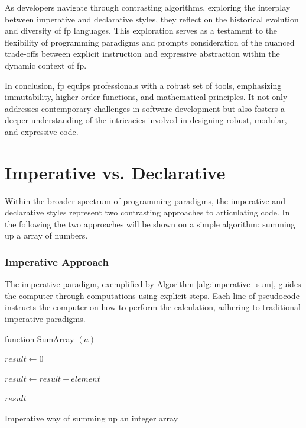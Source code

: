     As developers navigate through contrasting algorithms, exploring the interplay between imperative and declarative styles, they reflect on the historical evolution and diversity of \ac{fp} languages. This exploration serves as a testament to the flexibility of programming paradigms and prompts consideration of the nuanced trade-offs between explicit instruction and expressive abstraction within the dynamic context of \ac{fp}.
    
    In conclusion, \ac{fp} equips professionals with a robust set of tools, emphasizing immutability, higher-order functions, and mathematical principles. It not only addresses contemporary challenges in software development but also fosters a deeper understanding of the intricacies involved in designing robust, modular, and expressive code.
    

\section*{Imperative vs. Declarative}

Within the broader spectrum of programming paradigms, the imperative and declarative styles represent two contrasting approaches to articulating code. In the following the two approaches will be shown on a simple algorithm: summing up a array of numbers.

\subsubsection{Imperative Approach}

The imperative paradigm, exemplified by Algorithm \ref{alg:imperative_sum}, guides the computer through computations using explicit steps. Each line of pseudocode instructs the computer on how to perform the calculation, adhering to traditional imperative paradigms.

\begin{algorithm}

    \underline{function SumArray} $(a)$\;
    
    \BlankLine
    $result \leftarrow 0$
    
    {
        $result \leftarrow result + element$
    }
    
    \Return $result$
    
    \caption{Imperative way of summing up an integer array}
    \label{alg:imperative_sum}
\end{algorithm}

